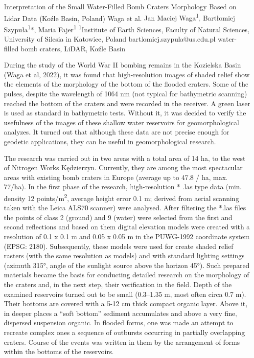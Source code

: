 \abstract
{Interpretation of the Small Water-Filled Bomb Craters Morphology Based on Lidar Data (Koźle Basin, Poland)} 
{Waga et al.} 
{Jan Maciej Waga\textsuperscript{1}, Bartłomiej Szypuła\textsuperscript{1}*, Maria Fajer\textsuperscript{1}} 
{\POtag} 
{
		\textsuperscript{1}Institute of Earth Sciences, Faculty of Natural Sciences, University of Silesia in Katowice, Poland
}
{bartlomiej.szypula@us.edu.pl}  %
{water-filled bomb craters, LiDAR, Koźle Basin}
{
During the study of the World War II bombing remains in the Kozielska Basin (Waga et al, 2022), it was found that high-resolution images of shaded relief show the elements of the morphology of the bottom of the flooded craters. Some of the pulses, despite the wavelength of 1064 nm (not typical for bathymetric scanning) reached the bottom of the craters and were recorded in the receiver. A green laser is used as standard in bathymetric tests. Without it, it was decided to verify the usefulness of the images of these shallow water reservoirs for geomorphological analyzes. It turned out that although these data are not precise enough for geodetic applications, they can be useful in geomorphological research.

The research was carried out in two areas with a total area of 14 ha, to the west of Nitrogen Works Kędzierzyn. Currently, they are among the most spectacular areas with existing bomb craters in Europe (average up to 47.8 / ha, max. 77/ha). In the first phase of the research, high-resolution * .las type data (min. density 12 points/m\textsuperscript{2}, average height error 0.1 m; derived from aerial scanning taken with the Leica ALS70 scanner) were analysed. After filtering the *.las files the points of class 2 (ground) and 9 (water) were selected from the first and second reflections and based on them digital elevation models were created with a resolution of 0.1 x 0.1 m and 0.05 x 0.05 m in the PUWG-1992 coordinate system (EPSG: 2180). Subsequently, these models were used for create shaded relief rasters (with the same resolution as models) and with standard lighting settings (azimuth 315°, angle of the sunlight source above the horizon 45°). Such prepared materials became the basis for conducting detailed research on the morphology of the craters and, in the next step, their verification in the field. Depth of the examined reservoirs turned out to be small (0.3--1.35 m, most often circa 0.7 m). Their bottoms are covered with a 5-12 cm thick compact organic layer. Above it, in deeper places a \enquote{soft bottom} sediment accumulates and above a very fine, dispersed suspension organic. In flooded forms, one was made an attempt to recreate complex ones a sequence of outbursts occurring in partially overlapping craters. Course of the events was written in them by the arrangement of forms within the bottoms of the reservoirs. 

}
